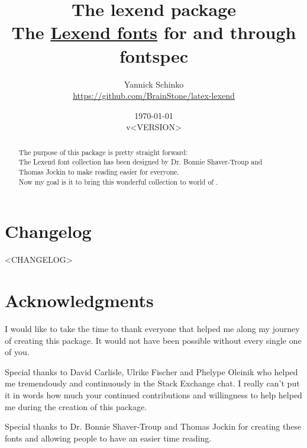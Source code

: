 \documentclass[oneside,a4paper]{l3doc}
\begin{document}
\title{
	The \textsf{lexend} package\\
	\large{The \href{https://www.lexend.com/}{\textsf{Lexend} fonts} for  and
	 through \textsf{fontspec}}
}
\author{
	Yannick Schinko\\
	\texorpdfstring{\url{https://github.com/BrainStone/latex-lexend}}{}
}
\date{
	\today\\
	v<VERSION>
}

\maketitle

\bigskip

\begin{abstract}
The purpose of this package is pretty straight forward:\\
The Lexend font collection has been designed by Dr. Bonnie Shaver-Troup and Thomas Jockin to make
reading easier for everyone.\\
Now my goal is it to bring this wonderful collection to world of .
\end{abstract}

\bigskip
\tableofcontents
\newpage


\section{Changelog}

<CHANGELOG>

\section{Acknowledgments}

I would like to take the time to thank everyone that helped me along my journey of creating this
package. It would not have been possible without every single one of you.

Special thanks to David Carlisle, Ulrike Fischer and Phelype Oleinik who helped me tremendously and
continuously in the  Stack Exchange chat. I really can't put it in words how much your
continued contributions and willingness to help helped me during the creation of this package.

Special thanks to Dr. Bonnie Shaver-Troup and Thomas Jockin for creating these fonts and allowing
people to have an easier time reading.
\end{document}
